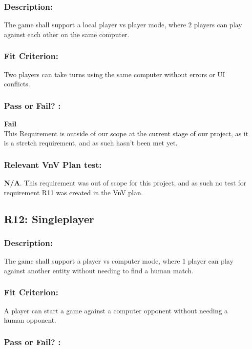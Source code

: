 \documentclass[12pt, titlepage]{article}
\begin{document}
\subsubsection*{Description:}The game shall support a local player vs player mode, where 2 players can play against each other on the same computer.

\subsubsection*{Fit Criterion:}Two players can take turns using the same computer without errors or UI conflicts.

\subsubsection*{Pass or Fail? :} 

 \noindent \textbf{Fail}\\
 
  This Requirement is outside of our scope at the current stage of our project, as it is a stretch requirement, and as such hasn't been met yet.

\subsubsection*{Relevant VnV Plan test: } \textbf{N/A}. This requirement was out of scope for this project, and as such no test for requirement R11 was created in the VnV plan.


\subsection{R12: Singleplayer} 
\label{R12} 

\subsubsection*{Description:}The game shall support a player vs computer mode, where 1 player can play against another entity without needing to find a human match.

\subsubsection*{Fit Criterion:} A player can start a game against a computer opponent without needing a human opponent.

\subsubsection*{Pass or Fail? :} 
\end{document}
